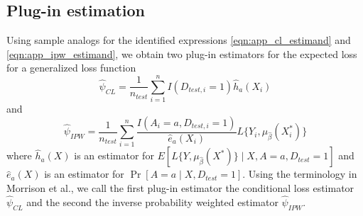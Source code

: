     \subsection{Plug-in estimation}
    Using sample analogs for the identified expressions \ref{eqn:app_cl_estimand} and \ref{eqn:app_ipw_estimand}, we obtain two plug-in estimators for the expected loss for a generalized loss function
    \begin{equation*}
        \widehat{\psi}_{CL} = \frac{1}{n_{test}}\sum_{i=1}^nI(D_{test, i} = 1)\widehat{h}_a(X_i)
    \end{equation*}
    and 
    \begin{equation*}
        \widehat{\psi}_{IPW} = \frac{1}{n_{test}} \sum_{i=1}^n \frac{I(A_i = a, D_{test, i} = 1)}{ \widehat{e}_a(X_i)} L\{Y_i, \mu_{\widehat{\beta}}(X^*_i)\}
    \end{equation*}
    where $\widehat{h}_a(X)$ is an estimator for $E[L\{Y, \mu_{\widehat{\beta}}(X^*)\}\mid X,A = a, D_{test} = 1]$ and $\widehat{e}_a(X)$ is an estimator for $\Pr[A = a \mid X,D_{test} = 1]$. Using the terminology in Morrison et al., we call the first plug-in estimator the conditional loss estimator $ \widehat{\psi}_{CL}$ and the second the inverse probability weighted estimator $\widehat{\psi}_{IPW}$. 

